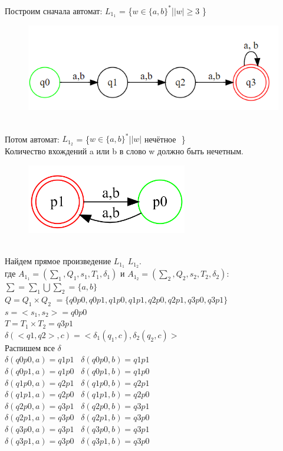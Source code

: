 \documentclass[a4paper]{article}
\begin{document}
\begin{enumerate}
Построим сначала автомат: 
$L_1_1$ = \{$ w \in \{a,b\}^*   $|$  {|w|} \ge 3 $ \} \\
\begin{figure}[h]
\centering
\includegraphics[width=15cm]{Задание_№2_2_1.png}
\end{figure}
\\Потом автомат:
$L_1_2$ = \{$ w \in \{a,b\}^*   $|$  {|w|} $ нечётное $ $ \} \\
Количество вхождений a или b в слово w должно быть нечетным.

\begin{figure}[h]
\centering
\includegraphics[width=7cm]{Задание_№2_2_2.png}
\end{figure}

\\Найдем прямое произведение $L_1_1$ \cap $L_1_2$.
\\где  $A_1_1 = (\sum_1 , Q_1, s_1, T_1, \delta_1) $ и  $A_1_2 = (\sum_2 , Q_2, s_2, T_2, \delta_2)$:\\
\hfill \break
$\sum = \sum_1 \bigcup \sum_2 = \{a, b\}$\\
$Q = Q_1 \times Q_2$ $= \{q0p0, q0p1, q1p0, q1p1, q2p0, q2p1, q3p0, q3p1 \}$\\
$s = <s_1, s_2> = q0p0$\\
$T = T_1 \times T_2 = q3p1$\\
$ \delta(<q1, q2>, c) = <\delta_1(q_1, c), \delta_2(q_2, c)>$\\ Распишем все $\delta$ \\
$\delta(q0p0, a) = q1p1$ \  $\delta(q0p0, b) = q1p1$ \\
$\delta(q0p1, a) = q1p0$ \  $\delta(q0p1, b) = q1p0$ \\
$\delta(q1p0, a) = q2p1$ \  $\delta(q1p0, b) = q2p1$ \\
$\delta(q1p1, a) = q2p0$ \  $\delta(q1p1, b) = q2p0$ \\
$\delta(q2p0, a) = q3p1$ \  $\delta(q2p0, b) = q3p1$ \\
$\delta(q2p1, a) = q3p0$ \  $\delta(q2p1, b) = q3p0$ \\
$\delta(q3p0, a) = q3p1$ \  $\delta(q3p0, b) = q3p1$ \\
$\delta(q3p1, a) = q3p0$ \  $\delta(q3p1, b) = q3p0$ \\


\end{enumerate}
\end{document}
